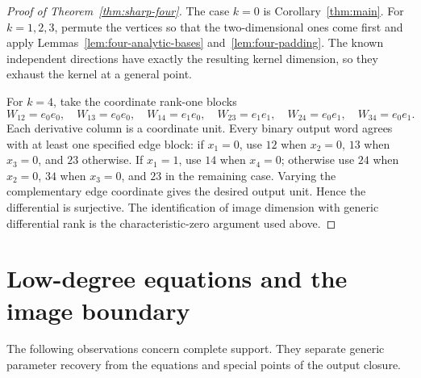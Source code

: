 \documentclass[11pt]{article}
\theoremstyle{remark}\newtheorem{remark}[theorem]{Remark}
\begin{document}
\begin{proof}[Proof of Theorem~\ref{thm:sharp-four}]
The case $k=0$ is Corollary~\ref{thm:main}. For $k=1,2,3$,
permute the vertices so that the two-dimensional ones come first and
apply Lemmas~\ref{lem:four-analytic-bases} and~\ref{lem:four-padding}.
The known independent directions have exactly the resulting kernel
dimension, so they exhaust the kernel at a general point.

For $k=4$, take the coordinate rank-one blocks
\[
 W_{12}=e_0e_0,\quad W_{13}=e_0e_0,\quad W_{14}=e_1e_0,
 \quad W_{23}=e_1e_1,\quad W_{24}=e_0e_1,\quad W_{34}=e_0e_1.
\]
Each derivative column is a coordinate unit. Every binary output word
agrees with at least one specified edge block: if $x_1=0$, use $12$
when $x_2=0$, $13$ when $x_3=0$, and $23$ otherwise. If $x_1=1$,
use $14$ when $x_4=0$; otherwise use $24$ when $x_2=0$, $34$ when
$x_3=0$, and $23$ in the remaining case. Varying the complementary
edge coordinate gives the desired output unit. Hence the differential
is surjective. The identification of image dimension with generic
differential rank is the characteristic-zero argument used above.
\end{proof}



\section{Low-degree equations and the image boundary}
\label{sec:boundary}
The following observations concern complete support. They separate generic parameter recovery from the equations and special points of the output closure.
\end{document}
